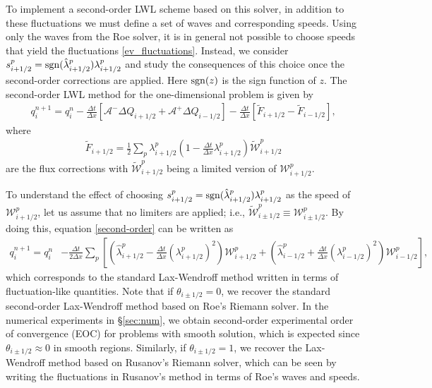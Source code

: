 \documentclass[preprint, 11pt]{article}
\newcommand{\W}{{\mathcal W}}
\newcommand{\A}{{\mathcal A}}
\newcommand{\sgn}{{\rm sgn}}
\begin{document}
To implement a second-order LWL scheme based on this solver, in addition to
these fluctuations we must define a set of waves and corresponding speeds.
Using only the waves from the Roe solver, it is in general not possible
to choose speeds that yield the fluctuations \eqref{ev_fluctuations}.
Instead, we consider
$s_{i+1/2}^p=\sgn(\hat\lambda_{i+1/2}^p)\lambda_{i+1/2}^p$
 and study the consequences of this choice once the second-order corrections are applied.
Here $\sgn(z)$ is the sign function of $z$.
The second-order LWL method for the one-dimensional problem is given by
\begin{align}\label{second-order}
  q_i^{n+1}=q_i^n
  -\frac{\Delta t}{\Delta x}\left[\A^-\Delta Q_{i+1/2}+\A^+\Delta Q_{i-1/2}\right]
  -\frac{\Delta t}{\Delta x}\left[\tilde F_{i+1/2}-\tilde F_{i-1/2}\right],
\end{align}
where
\begin{align*}
  \tilde F_{i+1/2} = \frac{1}{2}\sum_p\lambda_{i+1/2}^p
  \left(1-\frac{\Delta t}{\Delta x}\lambda_{i+1/2}^p\right)\tilde\W_{i+1/2}^p
\end{align*}
are the flux corrections with $\tilde\W_{i+1/2}^p$ being a limited version of $\W_{i+1/2}^p$.

To understand the effect of choosing $s_{i+1/2}^p=\sgn(\hat\lambda_{i+1/2}^p)\lambda_{i+1/2}^p$
as the speed of $\W_{i+1/2}^p$,
let us assume that no limiters are applied; i.e., $\tilde\W_{i\pm 1/2}^p\equiv \W_{i\pm 1/2}^p$.
By doing this, equation \eqref{second-order} can be written as
\begin{align*}
  q_i^{n+1}=q_i^n
  &-\frac{\Delta t}{2 \Delta x}
  \sum_p
  \left[\left(\hat\lambda_{i+1/2}^p -\frac{\Delta t}{\Delta x}(\lambda_{i+1/2}^p)^2 \right)\W_{i+1/2}^p
  +
  \left(\hat\lambda_{i-1/2}^p +\frac{\Delta t}{\Delta x}(\lambda_{i-1/2}^p)^2 \right)\W_{i-1/2}^p\right],
\end{align*}
which corresponds to the standard Lax-Wendroff method written in terms of fluctuation-like quantities.
Note that if $\theta_{i\pm 1/2}=0$, we recover the standard second-order Lax-Wendroff method based on
Roe's Riemann solver.
In the numerical experiments in \S\ref{sec:num}, we obtain second-order experimental
order of convergence (EOC) for problems with smooth solution, which is expected since
$\theta_{i\pm 1/2}\approx 0$ in smooth regions.
Similarly, if $\theta_{i\pm 1/2}=1$, we recover the Lax-Wendroff method based on Rusanov's Riemann solver,
which can be seen by writing the fluctuations in Rusanov's method in terms of Roe's waves and speeds.
\end{document}

